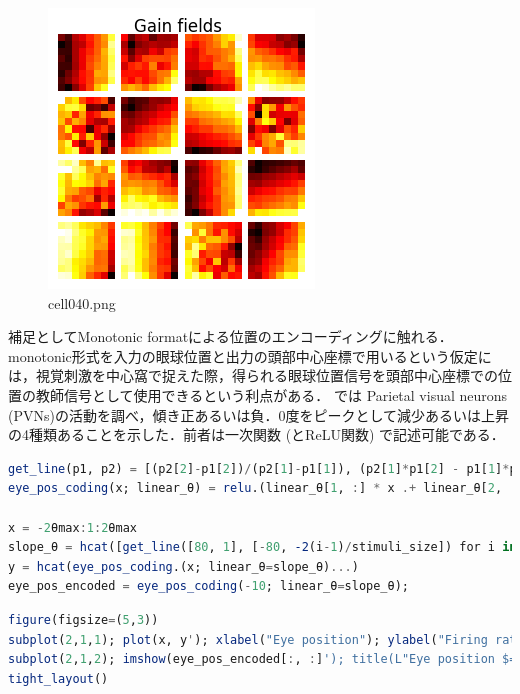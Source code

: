 \begin{figure}[ht]
	\centering
	\includegraphics[scale=0.8, max width=\linewidth]{./fig/solve-credit-assignment-problem/backpropagation/cell040.png}
	\caption{cell040.png}
	\label{cell040.png}
\end{figure}
補足としてMonotonic formatによる位置のエンコーディングに触れる．monotonic形式を入力の眼球位置と出力の頭部中心座標で用いるという仮定には，視覚刺激を中心窩で捉えた際，得られる眼球位置信号を頭部中心座標での位置の教師信号として使用できるという利点がある．\citep{Andersen1983-zp} では Parietal visual neurons (PVNs)の活動を調べ，傾き正あるいは負．0度をピークとして減少あるいは上昇の4種類あることを示した．前者は一次関数 (とReLU関数) で記述可能である．
\begin{lstlisting}[language=julia]
get_line(p1, p2) = [(p2[2]-p1[2])/(p2[1]-p1[1]), (p2[1]*p1[2] - p1[1]*p2[2])/(p2[1]-p1[1])] # [slope, intercept]
eye_pos_coding(x; linear_θ) = relu.(linear_θ[1, :] * x .+ linear_θ[2, :])

x = -2θmax:1:2θmax
slope_θ = hcat([get_line([80, 1], [-80, -2(i-1)/stimuli_size]) for i in 1:stimuli_size]...)
y = hcat(eye_pos_coding.(x; linear_θ=slope_θ)...)
eye_pos_encoded = eye_pos_coding(-10; linear_θ=slope_θ);
\end{lstlisting}
\begin{lstlisting}[language=julia]
figure(figsize=(5,3))
subplot(2,1,1); plot(x, y'); xlabel("Eye position"); ylabel("Firing rate")
subplot(2,1,2); imshow(eye_pos_encoded[:, :]'); title(L"Eye position $=-10^\circ$"); xlabel("Units") 
tight_layout()
\end{lstlisting}
